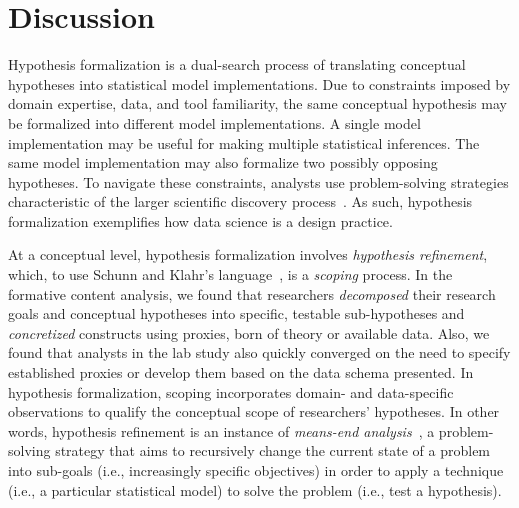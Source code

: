 \section{Discussion}
Hypothesis formalization is a dual-search process of translating conceptual
hypotheses into statistical model implementations. Due to constraints imposed by
domain expertise, data, and tool familiarity, the same conceptual hypothesis may
be formalized into different model implementations. A single model implementation may be useful for making multiple statistical inferences. The same model
implementation may also formalize two possibly opposing hypotheses. To navigate
these constraints, analysts use problem-solving strategies characteristic of the
larger scientific discovery process~\cite{klahr1988dual,schunn1995FourSpace}. As
such, hypothesis formalization exemplifies how data science is a design
practice. 
 
At a conceptual level, hypothesis formalization involves \textit{hypothesis
refinement}, which, to use Schunn and Klahr's
language~\cite{schunn1995FourSpace}, is a \textit{scoping} process. In the
formative content analysis, we found that researchers \textit{decomposed} their
research goals and conceptual hypotheses into specific, testable sub-hypotheses
and \textit{concretized} constructs using proxies, born of theory or available
data. Also, we found that analysts in the lab study also quickly converged on
the need to specify established proxies or develop them based on the data schema
presented. In hypothesis formalization, scoping incorporates domain- and
data-specific observations to qualify the conceptual scope of researchers'
hypotheses. In other words, hypothesis refinement is an instance of
\textit{means-end analysis}~\cite{newell1972humanProblemSolving}, a
problem-solving strategy that aims to recursively change the current state of a
problem into sub-goals (i.e., increasingly specific objectives) in order to
apply a technique (i.e., a particular statistical model) to solve the problem
(i.e., test a hypothesis). 


